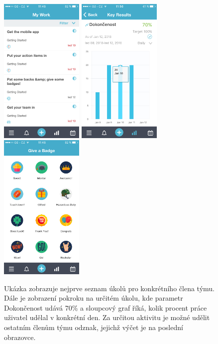 \begin{figure}[H]
\centering
\includegraphics[width= 4cm]{obrazky-figures/IMG_0344}
\includegraphics[width= 4cm]{obrazky-figures/IMG_0346}
\includegraphics[width= 4cm]{obrazky-figures/IMG_0343}
\caption{Ukázka zobrazuje nejprve seznam úkolů pro konkrétního člena týmu. Dále je zobrazení pokroku na určitém úkolu, kde parametr Dokončenost udává 70\% a sloupcový graf říká, kolik procent práce uživatel udělal v konkrétní den. Za určitou aktivitu je možné udělit ostatním členům týmu odznak, jejichž výčet je na poslední obrazovce. }
\label{work}
\end{figure}

